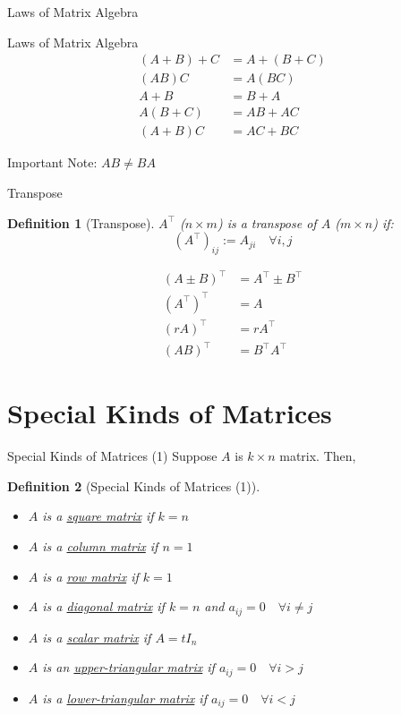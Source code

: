 \documentclass[final]{beamer}
\newtheorem{defn}{Definition}
\begin{document}
\begin{frame}[t]{Laws of Matrix Algebra}
	\begin{block}
		{Laws of Matrix Algebra}
		\begin{align*}
				(A+B)+C &= A+(B+C) \tag{Associative Law for Addition}\\
				(AB)C&=A(BC)\tag{Associative Law for Multiplication}\\
				A+B &= B+A \tag{Commutative Law for Addition}\\
				A(B+C)&=AB+AC \tag{Distributive Law}\\
				(A+B)C&=AC+BC \tag{Distributive Law}
		\end{align*}
	\end{block}
	Important Note: $AB\neq BA$
\end{frame}

\begin{frame}[t]{Transpose}
	\begin{defn}
		[Transpose]
		$A^\intercal$ ($n\times m$) is a transpose of $A$ ($m\times n$) if: \[
			(A^\intercal)_{ij} := A_{ji}\quad \forall i,j
		\]
	\end{defn}
	\begin{align*}
		(A\pm B)^\intercal &= A^\intercal \pm B^\intercal\\
		(A^\intercal)^\intercal &= A\\
		(rA)^\intercal &= r A^\intercal\\
		(AB)^\intercal &= B^\intercal A^\intercal \tag{Theorem 8.1}
	\end{align*}
\end{frame}

\section{Special Kinds of Matrices} %
\label{sec:special_kinds_of_matrices}
\begin{frame}[t]{Special Kinds of Matrices (1)}
	Suppose $A$ is $k\times n$ matrix. Then,
	\begin{defn}
		[Special Kinds of Matrices (1)]
		\begin{itemize}
			\item $A$ is a \uline{square matrix} if $k=n$
			\item $A$ is a \uline{column matrix} if $n=1$
			\item $A$ is a \uline{row matrix} if $k=1$
			\item $A$ is a \uline{diagonal matrix} if $k=n$ and $a_{ij}=0\quad \forall i\neq j$
			\item $A$ is a \uline{scalar matrix} if $A=tI_n$
			\item $A$ is an \uline{upper-triangular matrix} if $a_{ij}=0\quad\forall i>j$
			\item $A$ is a \uline{lower-triangular matrix} if $a_{ij}=0\quad\forall i<j$
		\end{itemize}
	\end{defn}
\end{frame}
\end{document}
